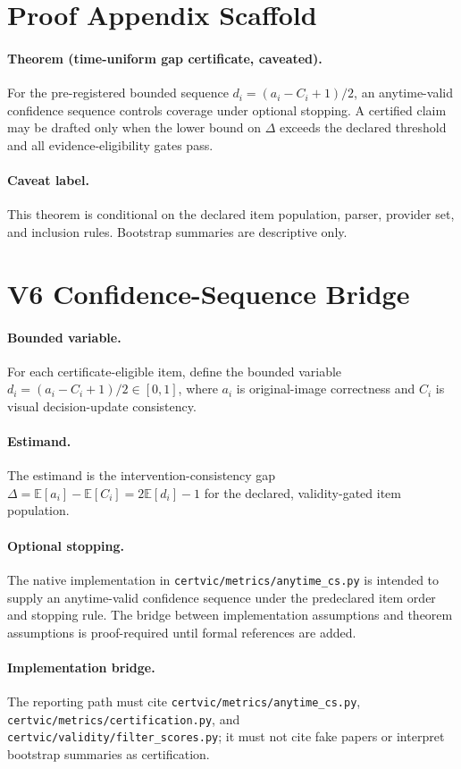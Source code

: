 \section{Proof Appendix Scaffold}

\paragraph{Theorem (time-uniform gap certificate, caveated).}
For the pre-registered bounded sequence $d_i=(a_i-C_i+1)/2$, an anytime-valid
confidence sequence controls coverage under optional stopping. A certified
claim may be drafted only when the lower bound on $\Delta$ exceeds the declared
threshold and all evidence-eligibility gates pass.

\paragraph{Caveat label.}
This theorem is conditional on the declared item population, parser, provider
set, and inclusion rules. Bootstrap summaries are descriptive only.

\section{V6 Confidence-Sequence Bridge}

\paragraph{Bounded variable.}
For each certificate-eligible item, define the bounded variable
$d_i=(a_i-C_i+1)/2 \in [0,1]$, where $a_i$ is original-image correctness and
$C_i$ is visual decision-update consistency.

\paragraph{Estimand.}
The estimand is the intervention-consistency gap
$\Delta = \mathbb{E}[a_i] - \mathbb{E}[C_i] = 2\mathbb{E}[d_i]-1$ for the
declared, validity-gated item population.

\paragraph{Optional stopping.}
The native implementation in \texttt{certvic/metrics/anytime_cs.py} is intended
to supply an anytime-valid confidence sequence under the predeclared item order
and stopping rule. The bridge between implementation assumptions and theorem
assumptions is proof-required until formal references are added.

\paragraph{Implementation bridge.}
The reporting path must cite \texttt{certvic/metrics/anytime_cs.py},
\texttt{certvic/metrics/certification.py}, and
\texttt{certvic/validity/filter_scores.py}; it must not cite fake papers or
interpret bootstrap summaries as certification.
